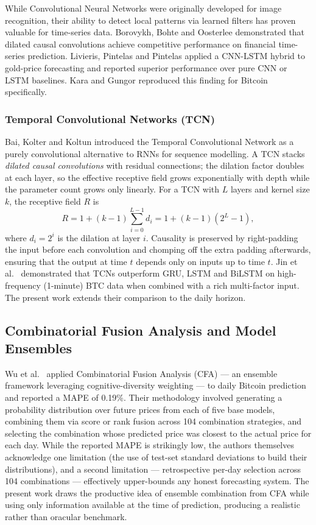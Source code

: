 \documentclass[12pt]{article}
\begin{document}
While Convolutional Neural Networks were originally developed for image recognition, their ability to detect local patterns via learned filters has proven valuable for time-series data. Borovykh, Bohte and Oosterlee \cite{borovykh2017} demonstrated that dilated causal convolutions achieve competitive performance on financial time-series prediction. Livieris, Pintelas and Pintelas \cite{livieris2020} applied a CNN-LSTM hybrid to gold-price forecasting and reported superior performance over pure CNN or LSTM baselines. Kara and Gungor \cite{kara2022} reproduced this finding for Bitcoin specifically.

\subsubsection{Temporal Convolutional Networks (TCN)}

Bai, Kolter and Koltun \cite{bai2018tcn} introduced the Temporal Convolutional Network as a purely convolutional alternative to RNNs for sequence modelling. A TCN stacks \emph{dilated causal convolutions} with residual connections; the dilation factor doubles at each layer, so the effective receptive field grows exponentially with depth while the parameter count grows only linearly. For a TCN with $L$ layers and kernel size $k$, the receptive field $R$ is
\begin{equation}
    R = 1 + (k - 1)\sum_{i=0}^{L-1} d_i = 1 + (k-1)(2^L - 1),
\label{eq:tcn-receptive-field}
\end{equation}
where $d_i = 2^i$ is the dilation at layer $i$. Causality is preserved by right-padding the input before each convolution and chomping off the extra padding afterwards, ensuring that the output at time $t$ depends only on inputs up to time $t$. Jin et al.\ \cite{jin2025tcn} demonstrated that TCNs outperform GRU, LSTM and BiLSTM on high-frequency (1-minute) BTC data when combined with a rich multi-factor input. The present work extends their comparison to the daily horizon.

\subsection{Combinatorial Fusion Analysis and Model Ensembles}

Wu et al.\ \cite{wu2025cfa} applied Combinatorial Fusion Analysis (CFA) --- an ensemble framework leveraging cognitive-diversity weighting --- to daily Bitcoin prediction and reported a MAPE of 0.19\%. Their methodology involved generating a probability distribution over future prices from each of five base models, combining them via score or rank fusion across 104 combination strategies, and selecting the combination whose predicted price was closest to the actual price for each day. While the reported MAPE is strikingly low, the authors themselves acknowledge one limitation (the use of test-set standard deviations to build their distributions), and a second limitation --- retrospective per-day selection across 104 combinations --- effectively upper-bounds any honest forecasting system. The present work draws the productive idea of ensemble combination from CFA while using only information available at the time of prediction, producing a realistic rather than oracular benchmark.
\end{document}
